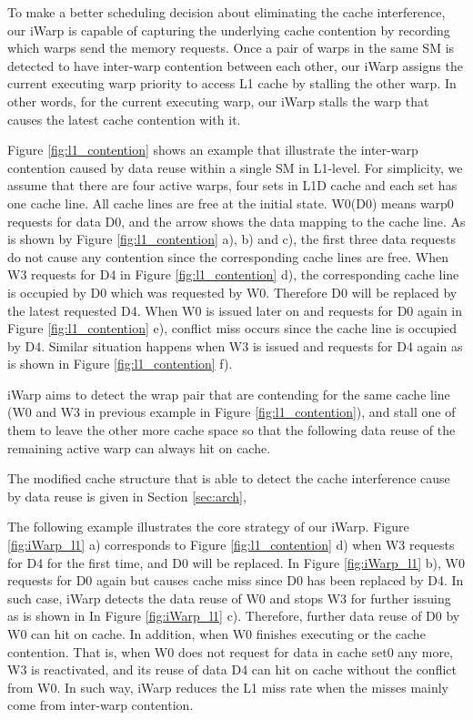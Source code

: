 \documentclass{sigplanconf}
\begin{document}
To make a better scheduling decision about eliminating the cache interference, our iWarp is capable of capturing the underlying cache contention by recording which warps send the memory requests. Once a pair of warps in the same SM is detected to have inter-warp contention between each other, our iWarp assigns the current executing warp priority to access L1 cache by stalling the other warp. In other words, for the current executing warp, our iWarp stalls the warp that causes the latest cache contention with it.

Figure \ref{fig:l1_contention} shows an example that illustrate the inter-warp contention caused by data reuse within a single SM in L1-level. For simplicity, we assume that there are four active warps, four sets in L1D cache and each set has one cache line. All cache lines are free at the initial state. W0(D0) means warp0 requests for data D0, and the arrow shows the data mapping to the cache line. As is shown by Figure \ref{fig:l1_contention} a), b) and c), the first three data requests do not cause any contention since the corresponding cache lines are free. When W3 requests for D4 in Figure \ref{fig:l1_contention} d), the corresponding cache line is occupied by D0 which was requested by W0. Therefore D0 will be replaced by the latest requested D4. When W0 is issued later on and requests for D0 again in Figure \ref{fig:l1_contention} e), conflict miss occurs since the cache line is occupied by D4. Similar situation happens when W3 is issued and requests for D4 again as is shown in Figure \ref{fig:l1_contention} f).

iWarp aims to detect the wrap pair that are contending for the same cache line (W0 and W3 in previous example in Figure \ref{fig:l1_contention}), and stall one of them to leave the other more cache space so that the following data reuse of the remaining active warp can always hit on cache.

The modified cache structure that is able to detect the cache interference cause by data reuse is given in Section \ref{sec:arch},

The following example illustrates the core strategy of our iWarp. Figure \ref{fig:iWarp_l1} a) corresponds to Figure \ref{fig:l1_contention} d) when W3 requests for D4 for the first time, and D0 will be replaced. In Figure \ref{fig:iWarp_l1} b), W0 requests for D0 again but causes cache miss since D0 has been replaced by D4. In such case, iWarp detects the data reuse of W0 and stops W3 for further issuing as is shown in In Figure \ref{fig:iWarp_l1} c). Therefore, further data reuse of D0 by W0 can hit on cache. In addition, when W0 finishes executing or the cache contention. That is, when W0 does not request for data in cache set0 any more, W3 is reactivated, and its reuse of data D4 can hit on cache without the conflict from W0. In such way, iWarp reduces the L1 miss rate when the misses mainly come from inter-warp contention.
\end{document}
